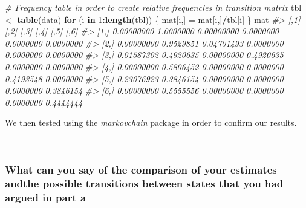 \documentclass[]{article}
\newenvironment{Shaded}{\begin{snugshade}}{\end{snugshade}}
\newcommand{\CommentTok}[1]{\textcolor[rgb]{0.56,0.35,0.01}{\textit{#1}}}
\newcommand{\ControlFlowTok}[1]{\textcolor[rgb]{0.13,0.29,0.53}{\textbf{#1}}}
\newcommand{\DecValTok}[1]{\textcolor[rgb]{0.00,0.00,0.81}{#1}}
\newcommand{\KeywordTok}[1]{\textcolor[rgb]{0.13,0.29,0.53}{\textbf{#1}}}
\newcommand{\NormalTok}[1]{#1}
\newcommand{\OperatorTok}[1]{\textcolor[rgb]{0.81,0.36,0.00}{\textbf{#1}}}
\newcommand{\StringTok}[1]{\textcolor[rgb]{0.31,0.60,0.02}{#1}}
\begin{document}
\begin{Shaded}
\begin{Highlighting}[]
\CommentTok{# Frequency table in order to create relative frequencies in transition matrix}
\NormalTok{tbl <-}\StringTok{ }\KeywordTok{table}\NormalTok{(data)}
\ControlFlowTok{for}\NormalTok{ (i }\ControlFlowTok{in} \DecValTok{1}\OperatorTok{:}\KeywordTok{length}\NormalTok{(tbl)) \{}
\NormalTok{  mat[i,] =}\StringTok{ }\NormalTok{mat[i,]}\OperatorTok{/}\NormalTok{tbl[i]}
\NormalTok{\}}
\NormalTok{mat}
\CommentTok{#>            [,1]      [,2]       [,3]      [,4]      [,5]      [,6]}
\CommentTok{#> [1,] 0.00000000 1.0000000 0.00000000 0.0000000 0.0000000 0.0000000}
\CommentTok{#> [2,] 0.00000000 0.9529851 0.04701493 0.0000000 0.0000000 0.0000000}
\CommentTok{#> [3,] 0.01587302 0.4920635 0.00000000 0.4920635 0.0000000 0.0000000}
\CommentTok{#> [4,] 0.00000000 0.5806452 0.00000000 0.0000000 0.4193548 0.0000000}
\CommentTok{#> [5,] 0.23076923 0.3846154 0.00000000 0.0000000 0.0000000 0.3846154}
\CommentTok{#> [6,] 0.00000000 0.5555556 0.00000000 0.0000000 0.0000000 0.4444444}
\end{Highlighting}
\end{Shaded}

\newpage

We then tested using the \emph{markovchain} package in order to confirm
our results.

\begin{Shaded}
\end{Shaded}

~

\hypertarget{what-can-you-say-of-the-comparison-of-your-estimates-andthe-possible-transitions-between-states-that-you-had-argued-in-part-a}{%
\subsubsection{What can you say of the comparison of your estimates
andthe possible transitions between states that you had argued in part
a}\label{what-can-you-say-of-the-comparison-of-your-estimates-andthe-possible-transitions-between-states-that-you-had-argued-in-part-a}}
\end{document}
